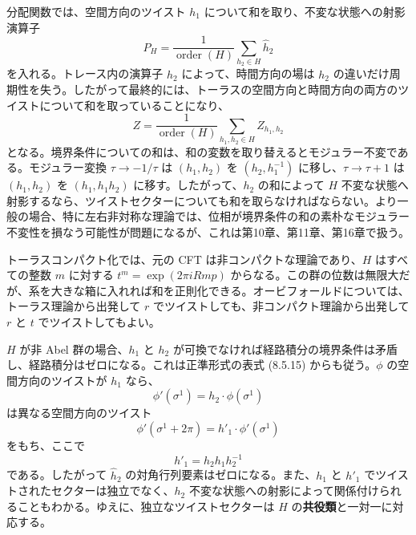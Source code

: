 分配関数では、空間方向のツイスト $h_1$ について和を取り、不変な状態への射影演算子
\begin{equation}
P_H=\frac1{\operatorname{order}(H)}
\sum_{h_2\in H}\widehat h_2
\tag{8.5.15}\label{eq:8.5.15}
\end{equation}
を入れる。トレース内の演算子 $\widehat h_2$ によって、時間方向の場は $h_2$ の違いだけ周期性を失う。したがって最終的には、トーラスの空間方向と時間方向の両方のツイストについて和を取っていることになり、
\begin{equation}
Z=\frac1{\operatorname{order}(H)}
\sum_{h_1,h_2\in H}Z_{h_1,h_2}
\tag{8.5.16}\label{eq:8.5.16}
\end{equation}
となる。境界条件についての和は、和の変数を取り替えるとモジュラー不変である。モジュラー変換 $\tau\to-1/\tau$ は $(h_1,h_2)$ を $(h_2,h_1^{-1})$ に移し、$\tau\to\tau+1$ は $(h_1,h_2)$ を $(h_1,h_1h_2)$ に移す。したがって、$h_2$ の和によって $H$ 不変な状態へ射影するなら、ツイストセクターについても和を取らなければならない。より一般の場合、特に左右非対称な理論では、位相が境界条件の和の素朴なモジュラー不変性を損なう可能性が問題になるが、これは第10章、第11章、第16章で扱う。

トーラスコンパクト化では、元の CFT は非コンパクトな理論であり、$H$ はすべての整数 $m$ に対する $t^m=\exp(2\pi iRmp)$ からなる。この群の位数は無限大だが、系を大きな箱に入れれば和を正則化できる。オービフォールドについては、トーラス理論から出発して $r$ でツイストしても、非コンパクト理論から出発して $r$ と $t$ でツイストしてもよい。

$H$ が非 Abel 群の場合、$h_1$ と $h_2$ が可換でなければ経路積分の境界条件は矛盾し、経路積分はゼロになる。これは正準形式の表式 (8.5.15) からも従う。$\phi$ の空間方向のツイストが $h_1$ なら、
\begin{equation}
\phi'(\sigma^1)=h_2\cdot\phi(\sigma^1)
\tag{8.5.17}\label{eq:8.5.17}
\end{equation}
は異なる空間方向のツイスト
\begin{equation}
\phi'(\sigma^1+2\pi)=h'_1\cdot\phi'(\sigma^1)
\tag{8.5.18}\label{eq:8.5.18}
\end{equation}
をもち、ここで
\begin{equation}
h'_1=h_2h_1h_2^{-1}
\tag{8.5.19}\label{eq:8.5.19}
\end{equation}
である。したがって $\widehat h_2$ の対角行列要素はゼロになる。また、$h_1$ と $h'_1$ でツイストされたセクターは独立でなく、$h_2$ 不変な状態への射影によって関係付けられることもわかる。ゆえに、独立なツイストセクターは $H$ の\textbf{共役類}と一対一に対応する。

